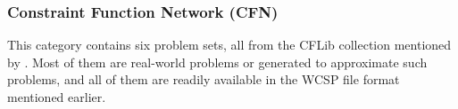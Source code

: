 
\subsubsection{Constraint Function Network (CFN)}
This category contains six problem sets, all from the CFLib collection mentioned by \textcite[\pno~3]{deGivry14}.
Most of them are real-world problems or generated to approximate such problems, and all of them are readily available in the \textsc{WCSP} file format mentioned earlier.

